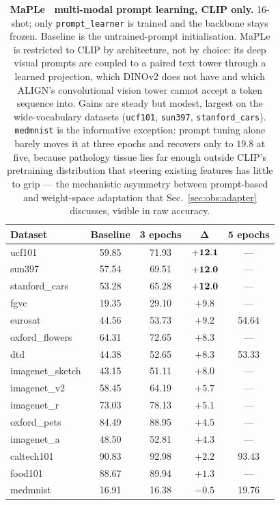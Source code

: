 \begin{table}[htbp]
\centering
\small
\caption{\textbf{MaPLe~\citep{khattak2023maple} multi-modal prompt learning, CLIP only.}
16-shot; only \texttt{prompt\_learner} is trained and the backbone stays frozen.
Baseline is the untrained-prompt initialisation. MaPLe is restricted to CLIP by
architecture, not by choice: its deep visual prompts are coupled to a paired text tower
through a learned projection, which DINOv2 does not have and which ALIGN's convolutional
vision tower cannot accept a token sequence into. Gains are steady but modest, largest
on the wide-vocabulary datasets (\texttt{ucf101}, \texttt{sun397},
\texttt{stanford\_cars}). \texttt{medmnist} is the informative exception: prompt tuning
alone barely moves it at three epochs and recovers only to $19.8$ at five, because
pathology tissue lies far enough outside CLIP's pretraining distribution that steering
existing features has little to grip --- the mechanistic asymmetry between prompt-based
and weight-space adaptation that Sec.~\ref{sec:obs:adapter} discusses, visible in raw
accuracy.}
\label{tab:expanded_maple}
\setlength{\tabcolsep}{8pt}
\begin{tabular}{lcccc}
\toprule
\textbf{Dataset} & \textbf{Baseline} & \textbf{3 epochs} & $\mathbf{\Delta}$ & \textbf{5 epochs} \\
\midrule
ucf101           & 59.85 & 71.93 & $\bf +12.1$ & --- \\
sun397           & 57.54 & 69.51 & $\bf +12.0$ & --- \\
stanford\_cars   & 53.28 & 65.28 & $\bf +12.0$ & --- \\
fgvc             & 19.35 & 29.10 & $+9.8$ & --- \\
eurosat          & 44.56 & 53.73 & $+9.2$ & 54.64 \\
oxford\_flowers  & 64.31 & 72.65 & $+8.3$ & --- \\
dtd              & 44.38 & 52.65 & $+8.3$ & 53.33 \\
imagenet\_sketch & 43.15 & 51.11 & $+8.0$ & --- \\
imagenet\_v2     & 58.45 & 64.19 & $+5.7$ & --- \\
imagenet\_r      & 73.03 & 78.13 & $+5.1$ & --- \\
oxford\_pets     & 84.49 & 88.95 & $+4.5$ & --- \\
imagenet\_a      & 48.50 & 52.81 & $+4.3$ & --- \\
caltech101       & 90.83 & 92.98 & $+2.2$ & 93.43 \\
food101          & 88.67 & 89.94 & $+1.3$ & --- \\
medmnist         & 16.91 & 16.38 & $-0.5$ & 19.76 \\
\bottomrule
\end{tabular}
\end{table}
